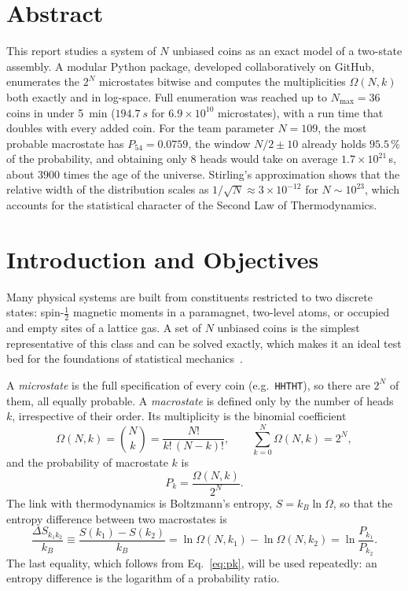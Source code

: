 \documentclass[11pt,a4paper]{article}
\begin{document}
\section*{Abstract}
This report studies a system of $N$ unbiased coins as an exact model of a two-state
assembly. A modular Python package, developed collaboratively on GitHub, enumerates the $2^N$
microstates bitwise and computes the multiplicities $\Omega(N,k)$ both exactly and in
log-space. Full enumeration was reached up to $N_{\max}=36$ coins in under \SI{5}{min}
($\SI{194.7}{s}$ for $6.9\times10^{10}$ microstates), with a run time that doubles with every
added coin. For the team parameter $N=109$, the most probable macrostate has
$P_{54}=0.0759$, the window $N/2\pm10$ already holds $95.5\,\%$ of the probability, and
obtaining only 8 heads would take on average $1.7\times10^{21}\,$s, about $3900$ times the age of
the universe. Stirling's approximation shows that the relative width of the distribution
scales as $1/\sqrt N\approx 3\times10^{-12}$ for $N\sim10^{23}$, which accounts for the
statistical character of the Second Law of Thermodynamics.

\section{Introduction and Objectives}
\label{sec:intro}
Many physical systems are built from constituents restricted to two discrete states: spin-$\tfrac12$
magnetic moments in a paramagnet, two-level atoms, or occupied and empty sites of a lattice gas.
A set of $N$ unbiased coins is the simplest representative of this class and can be solved
exactly, which makes it an ideal test bed for the foundations of statistical
mechanics~\cite{guide,schroeder}.

A \emph{microstate} is the full specification of every coin (e.g.\ \texttt{HHTHT}), so there are
$2^N$ of them, all equally probable. A \emph{macrostate} is defined only by the number of heads
$k$, irrespective of their order. Its multiplicity is the binomial coefficient
\begin{equation}
  \Omega(N,k)=\binom{N}{k}=\frac{N!}{k!\,(N-k)!},
  \qquad \sum_{k=0}^{N}\Omega(N,k)=2^N ,
  \label{eq:omega}
\end{equation}
and the probability of macrostate $k$ is
\begin{equation}
  P_k=\frac{\Omega(N,k)}{2^N}.
  \label{eq:pk}
\end{equation}
The link with thermodynamics is Boltzmann's entropy, $S=k_B\ln\Omega$, so that the entropy
difference between two macrostates is
\begin{equation}
  \frac{\Delta S_{k_1k_2}}{k_B}\equiv\frac{S(k_1)-S(k_2)}{k_B}
  =\ln\Omega(N,k_1)-\ln\Omega(N,k_2)=\ln\frac{P_{k_1}}{P_{k_2}} .
  \label{eq:ds}
\end{equation}
The last equality, which follows from Eq.~\eqref{eq:pk}, will be used repeatedly: an entropy
difference is the logarithm of a probability ratio.
\end{document}
